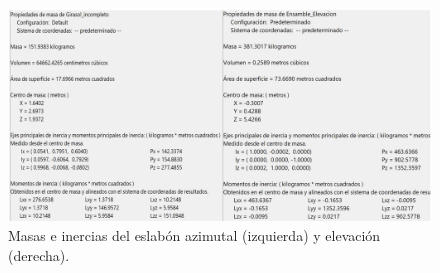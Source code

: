 \begin{figure}[H]
	\centering
	\includegraphics[width=\columnwidth]{imagenes/modelo2}
	\caption{Masas e inercias del eslabón azimutal (izquierda) y elevación (derecha).}
	\label{fig:modelo2}
\end{figure}

